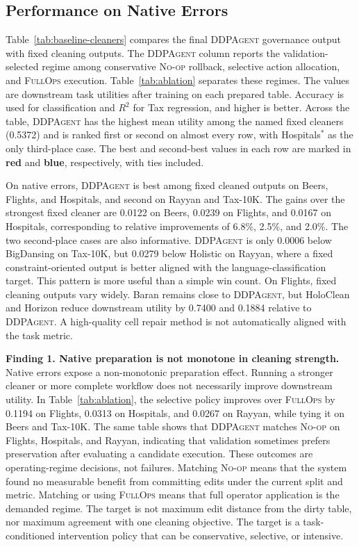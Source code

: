 \documentclass[sigconf, nonacm]{acmart}
\newcommand{\sys}{\textsc{DDPAgent}\xspace}
\newcommand{\noop}{\textsc{No-op}\xspace}
\newcommand{\fullops}{\textsc{FullOps}\xspace}
\newcommand{\best}[1]{\textcolor{rankFirst}{\textbf{#1}}}
\newcommand{\runner}[1]{\textcolor{rankSecond}{\textbf{#1}}}
\begin{document}
\subsection{Performance on Native Errors}
\label{sec:native-results}

Table~\ref{tab:baseline-cleaners} compares the final \sys governance output with fixed cleaning outputs. The \sys column reports the validation-selected regime among conservative \noop rollback, selective action allocation, and \fullops execution. Table~\ref{tab:ablation} separates these regimes. The values are downstream task utilities after training on each prepared table. Accuracy is used for classification and $R^2$ for Tax regression, and higher is better. Across the table, \sys has the highest mean utility among the named fixed cleaners (0.5372) and is ranked first or second on almost every row, with Hospitals$^*$ as the only third-place case. The best and second-best values in each row are marked in \best{red} and \runner{blue}, respectively, with ties included.

On native errors, \sys is best among fixed cleaned outputs on Beers, Flights, and Hospitals, and second on Rayyan and Tax-10K. The gains over the strongest fixed cleaner are 0.0122 on Beers, 0.0239 on Flights, and 0.0167 on Hospitals, corresponding to relative improvements of 6.8\%, 2.5\%, and 2.0\%. The two second-place cases are also informative. \sys is only 0.0006 below BigDansing on Tax-10K, but 0.0279 below Holistic on Rayyan, where a fixed constraint-oriented output is better aligned with the language-classification target. This pattern is more useful than a simple win count. On Flights, fixed cleaning outputs vary widely. Baran remains close to \sys, but HoloClean and Horizon reduce downstream utility by 0.7400 and 0.1884 relative to \sys. A high-quality cell repair method is not automatically aligned with the task metric.

\textbf{Finding 1. Native preparation is not monotone in cleaning strength.}
Native errors expose a non-monotonic preparation effect. Running a stronger cleaner or more complete workflow does not necessarily improve downstream utility. In Table~\ref{tab:ablation}, the selective policy improves over \fullops by 0.1194 on Flights, 0.0313 on Hospitals, and 0.0267 on Rayyan, while tying it on Beers and Tax-10K. The same table shows that \sys matches \noop on Flights, Hospitals, and Rayyan, indicating that validation sometimes prefers preservation after evaluating a candidate execution. These outcomes are operating-regime decisions, not failures. Matching \noop means that the system found no measurable benefit from committing edits under the current split and metric. Matching or using \fullops means that full operator application is the demanded regime. The target is not maximum edit distance from the dirty table, nor maximum agreement with one cleaning objective. The target is a task-conditioned intervention policy that can be conservative, selective, or intensive.
\end{document}
